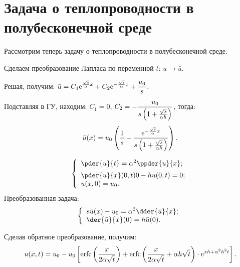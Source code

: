 \section{Задача о теплопроводности в полубесконечной среде}
\begin{minipage}{.6\textwidth}
    Рассмотрим теперь задачу о теплопроводности в полубесконечной среде.

    Сделаем преобразование Лапласа по переменной \( t \): \( u \to \bar{u} \).
        
    Решая, получим: \( \displaystyle \bar{u} = C_1\mathrm{e}^{\frac{\sqrt{s}}{\alpha}x} +
    C_2\mathrm{e}^{-\frac{\sqrt{s}}{\alpha}x} + \frac{u_0}{s} \).

    Подставляя в ГУ, находим: \( C_1 = 0 \), \( \displaystyle C_2 =
    -\frac{u_0}{s\left(1 + \frac{\sqrt{s}}{\alpha h}\right)} \), тогда:
    \[
        \bar{u}(x) = u_0\left(\frac{1}{s} - \frac{\mathrm{e}^{-\frac{\sqrt{s}}{\alpha}x}}
        {s\left(1 + \frac{\sqrt{s}}{\alpha h}\right)}\right).
    \]
\end{minipage}
\hfill
\begin{minipage}{.3\textwidth}
    \flushright
    \[
        \left\{ \begin{array}{l}
            \ds \pder{u}{t} = \alpha^2 \ppder{u}{x}; \\[.5em]
            \ds \pder{u}{x}(0,t) 0 - hu(0, t) = 0; \\
            u(x, 0) = u_0.
        \end{array} \right.
    \]
    Преобразованная задача:
    \[
        \left\{ \begin{array}{l}
            \ds s\bar{u}(x) - u_0 = \alpha^2\dder{\bar{u}}{x}; \\
            \ds \der{\bar{u}}{x}(0) = h\bar{u}(0).
        \end{array} \right.
    \]
\end{minipage}

Сделав обратное преобразование, получим:
\[
    u(x, t) = u_0 - u_0\left[\mathrm{erfc}\left(\frac{x}{2\alpha\sqrt{t}}\right) + 
    \mathrm{erfc}\left(\frac{x}{2\alpha\sqrt{t}} + \alpha h\sqrt{t}\right)\cdot
    \mathrm{e}^{xh + \alpha^2h^2 t}\right].
\]

\newpage
